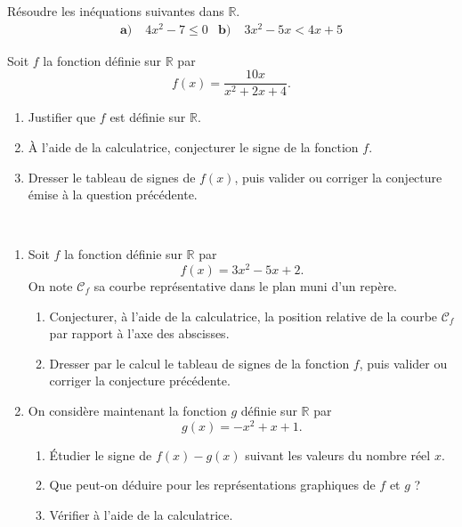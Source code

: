 \documentclass[11pt]{article}
\begin{document}
\begin{exo}
  Résoudre les inéquations suivantes dans $\mathbb{R}$.
  \begin{align*}
    \textbf{a)}&\; 4x^2-7\leq 0 &
    \textbf{b)}&\; 3x^2-5x < 4x+5
  \end{align*}
\end{exo}

\begin{exo}
  Soit $f$ la fonction définie sur $\mathbb{R}$ par
  \[
    f(x) = \frac{10x}{x^2+2x+4}.
  \]
  \begin{enumerate}
    \item Justifier que $f$ est définie sur $\mathbb{R}$.
    \item À l'aide de la calculatrice, conjecturer le signe de la fonction $f$.
    \item Dresser le tableau de signes de $f(x)$, puis valider ou corriger la
      conjecture émise à la question précédente.
  \end{enumerate}
\end{exo}

\begin{exo}~
  \begin{enumerate}
    \item Soit $f$ la fonction définie sur $\mathbb{R}$ par
      \[
        f(x) = 3x^2-5x+2.
      \]
      On note $\mathscr C_f$ sa courbe représentative dans le plan muni d'un
      repère.
      \begin{enumerate}
        \item Conjecturer, à l'aide de la calculatrice, la position relative de
          la courbe $\mathscr C_f$ par rapport à l'axe des abscisses.
        \item Dresser par le calcul le tableau de signes de la fonction $f$,
          puis valider ou corriger la conjecture précédente.
      \end{enumerate}
    \item On considère maintenant la fonction $g$ définie sur $\mathbb{R}$ par
      \[
        g(x) = -x^2+x+1.
      \]
      \begin{enumerate}
        \item Étudier le signe de $f(x)-g(x)$ suivant les valeurs du nombre réel
          $x$.
        \item Que peut-on déduire pour les représentations graphiques de $f$ et
          $g$ ?
        \item Vérifier à l'aide de la calculatrice.
      \end{enumerate}
  \end{enumerate}
\end{exo}
\end{document}
